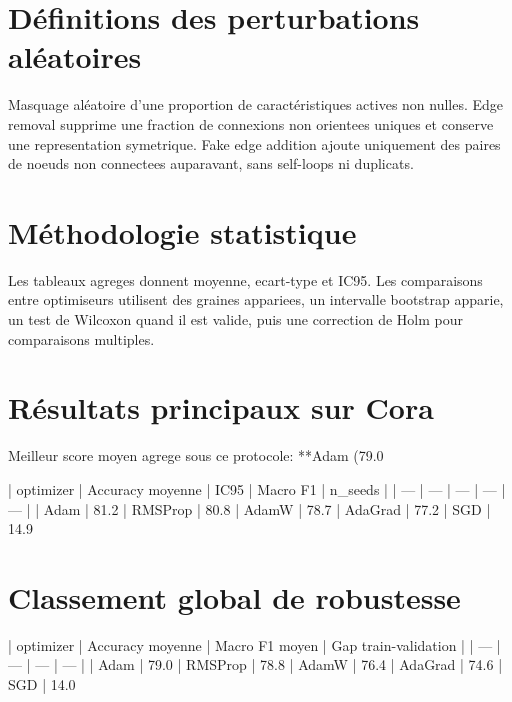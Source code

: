 \documentclass[11pt,a4paper]{article}
\begin{document}
\section{Définitions des perturbations aléatoires}
\par
Masquage aléatoire d’une proportion de caractéristiques actives non nulles. Edge removal supprime une fraction de connexions non orientees uniques et conserve une representation symetrique. Fake edge addition ajoute uniquement des paires de noeuds non connectees auparavant, sans self-loops ni duplicats.
\par
\section{Méthodologie statistique}
\par
Les tableaux agreges donnent moyenne, ecart-type et IC95. Les comparaisons entre optimiseurs utilisent des graines appariees, un intervalle bootstrap apparie, un test de Wilcoxon quand il est valide, puis une correction de Holm pour comparaisons multiples.
\par
\section{Résultats principaux sur Cora}
\par
Meilleur score moyen agrege sous ce protocole: **Adam (79.0%
\par
| optimizer | Accuracy moyenne | IC95 | Macro F1 | n_seeds |
| --- | --- | --- | --- | --- |
| Adam | 81.2%
| RMSProp | 80.8%
| AdamW | 78.7%
| AdaGrad | 77.2%
| SGD | 14.9%
\par
\section{Classement global de robustesse}
\par
| optimizer | Accuracy moyenne | Macro F1 moyen | Gap train-validation |
| --- | --- | --- | --- |
| Adam | 79.0%
| RMSProp | 78.8%
| AdamW | 76.4%
| AdaGrad | 74.6%
| SGD | 14.0%
\par
\end{document}
